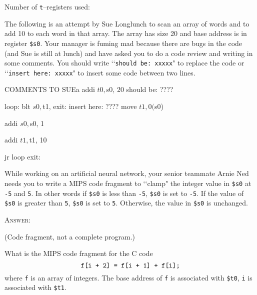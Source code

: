 Number of \verb!t!--registers used:
\\
\ANSWER
\begin{answercode}

\end{answercode}



\newpage
\nextq
The following is an attempt by Sue Longlunch to scan an array of 
words and to add 10 to each word in that array. 
The array has size 20 and base address is in register 
\verb!$s0!.
Your manager is fuming mad because there are bugs in the code
(and Sue is still at lunch) and have asked you to
do a code review and 
writing in some comments.
You should write \lq\lq \verb!should be: xxxxx!" to replace
the code or
\lq\lq\verb!insert here: xxxxx!" to insert some code between two lines.

\begin{answercode}
                                   COMMENTS TO SUEa
        addi    $t0, $s0, 20       should be: ????

loop:   blt     $s0, $t1, exit:    
                                   insert here: ????
        move    $t1, 0($s0)        

        addi    $s0, $s0, 1        

        addi    $t1, $t1, 10       
                                     
        jr      loop                 
exit:
\end{answercode}

\newpage
\nextq
While working on an artificial neural network,
your senior teammate Arnie Ned needs you to write a MIPS code fragment to 
\lq\lq clamp" the integer value in \verb!$s0! at \verb!-5! and \verb!5!.
In other words
if \verb!$s0! is less than \verb!-5!,
\verb!$s0! is set to \verb!-5!.
If the value of \verb!$s0! is
greater than \verb!5!,
\verb!$s0! is set to \verb!5!.
Otherwise, the value in \verb!$s0! is unchanged.

\textsc{Answer:}
\begin{answercode}

\end{answercode}
\vspace{-4mm}
(Code fragment, not a complete program.)

\newpage
\nextq
What is the MIPS code fragment for the C code
\[
  \verb!f[i + 2] = f[i + 1] + f[i];!
\]
where \verb!f! is an array of integers.
The base
address of \verb!f! is associated with \verb!$t0!, \verb!i!
is associated with \verb!$t1!.

